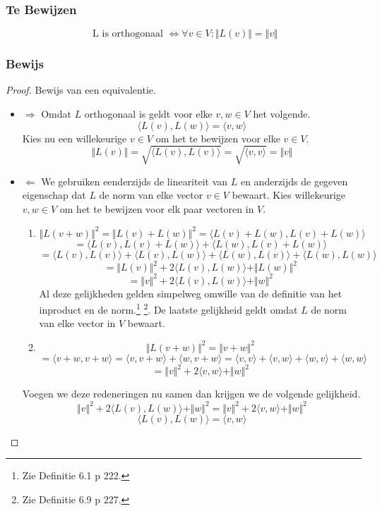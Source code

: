 \documentclass[lineaire_algebra_oplossingen.tex]{subfiles}
\begin{document}
\subsubsection*{Te Bewijzen}
\[
\text{ L is orthogonaal } \Leftrightarrow \forall v \in V: \Vert L(v) \Vert = \Vert v\Vert
\]

\subsubsection*{Bewijs}
\begin{proof}
Bewijs van een equivalentie.\\
\begin{itemize}
\item $\Rightarrow$
Omdat $L$ orthogonaal is geldt voor elke $v,w \in V$ het volgende.
\[
\langle L(v), L(w) \rangle = \langle v,w\rangle
\]
Kies nu een willekeurige $v \in V$ om het te bewijzen voor elke $v\in V$.
\[
\Vert L(v) \Vert = \sqrt{\langle L(v), L(v) \rangle} = \sqrt{\langle v, v \rangle} = \Vert v\Vert
\]

\item $\Leftarrow$
We gebruiken eenderzijds de lineariteit van $L$ en anderzijds de gegeven eigenschap dat $L$ de norm van elke vector $v \in V$ bewaart. Kies willekeurige $v,w \in V$ om het te bewijzen voor elk paar vectoren in $V$.
\begin{enumerate}
\item
\[
\Vert L(v+w) \Vert^2 = \Vert L(v)+L(w) \Vert^2 = \langle L(v)+L(w),L(v)+L(w) \rangle
\]
\[
= \langle L(v),L(v)+L(w) \rangle + \langle L(w),L(v)+L(w) \rangle
\]
\[
= \langle L(v),L(v) \rangle + \langle L(v),L(w) \rangle + \langle L(w),L(v) \rangle +\langle L(w),L(w) \rangle
\]
\[
= \Vert L(v)\Vert^2 + 2\langle L(v),L(w) \rangle +\Vert L(w)\Vert^2
\]
\[
= \Vert v\Vert^2 + 2\langle L(v),L(w) \rangle +\Vert w\Vert^2
\]
Al deze gelijkheden gelden simpelweg omwille van de definitie van het inproduct en de norm.\footnote{Zie Definitie 6.1 p 222.} \footnote{Zie Definitie 6.9 p 227.}. De laatste gelijkheid geldt omdat $L$ de norm van elke vector in $V$ bewaart.

\item
\[
\Vert L(v+w) \Vert^2 = \Vert v+w \Vert^2
\]
\[
= \langle v+w,v+w\rangle = \langle v,v+w\rangle + \langle w,v+w\rangle = \langle v,v\rangle + \langle v,w\rangle + \langle w,v\rangle + \langle w,w\rangle
\]
\[
= \Vert v\Vert^2 + 2\langle v,w \rangle +\Vert w\Vert^2
\]
\end{enumerate}
Voegen we deze redeneringen nu samen dan krijgen we de volgende gelijkheid.
\[
\Vert v\Vert^2 + 2\langle L(v),L(w) \rangle +\Vert w\Vert^2 = \Vert v\Vert^2 + 2\langle v,w \rangle +\Vert w\Vert^2
\]
\[
\langle L(v),L(w) \rangle =\langle v,w \rangle
\]
\end{itemize}
\end{proof}
\end{document}
